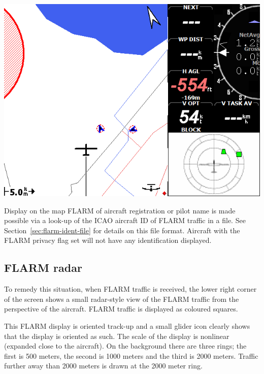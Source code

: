 \documentclass[a4paper,12pt]{refrep}
\begin{document}
\begin{center}
\includegraphics[angle=0,width=\linewidth,keepaspectratio='true']{figures/flarmmap.png}
\end{center}

Display on the map FLARM of aircraft registration or pilot name is
made possible via a look-up of the ICAO aircraft ID of FLARM traffic
in a file.  See Section~\ref{sec:flarm-ident-file} for details on this
file format.  Aircraft with the FLARM privacy flag set will not have
any identification displayed.

\subsection*{FLARM radar}

To remedy this situation, when FLARM traffic is received, the lower
right corner of the screen shows a small radar-style view of the FLARM
traffic from the perspective of the aircraft.  FLARM traffic is
displayed as coloured squares.

This FLARM display is oriented track-up and a small glider icon
clearly shows that the display is oriented as such.  The scale of the
display is nonlinear (expanded close to the aircraft).  On the
background there are three rings; the first is 500 meters, the second
is 1000 meters and the third is 2000 meters.  Traffic further away
than 2000 meters is drawn at the 2000 meter ring.
\end{document}
